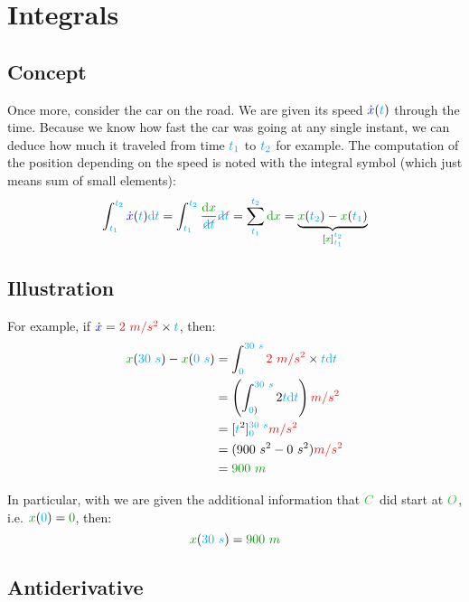 \section{Integrals}


\subsection{Concept}

Once more, consider the car on the road. We are given its speed
$\textcolor{blue}{\dot x}(\textcolor{cyan}{t})$ through the time. Because we know how fast the
car was going at any single instant, we can deduce how much it traveled
from time $\textcolor{cyan}{t_1}$ to $\textcolor{cyan}{t_2}$ for example. The computation
of the position depending on the speed is
noted with the integral symbol (which just means sum of small elements):
\[
\int_{\delay{t_1}}^{\delay{t_2}} \speed{\dot x}(\delay{t}) \delay{\dt}
= \int_{\delay{t_1}}^{\delay{t_2}} \frac {\dist{\d x}} {\strike[red]{\delay{\dt}}} \strike[red]{\delay{\dt}}
= \sum_{\delay{t_1}}^{\delay{t_2}} \dist{\d x}
= \underbrace{
	\dist{x}(\delay{t_2}) - \dist{x}(\delay{t_1})
}_{[\dist{x}]_{\delay{t_1}}^{\delay{t_2}}}
\]


\subsection{Illustration}

For example, if $\textcolor{blue}{\dot x} = \textcolor{red}{2~m/s^2} \times \textcolor{cyan}{t}$, then:
\begin{align*}
\dist{x}(\delay{30~s}) - \dist{x}(\delay{0~s})
&= \int_{\delay{0}}^{\delay{30~s}} \accel{2~m/s^2} \times \delay{t} \delay{\dt} \\
&= \left(\int_{\delay{0})}^{\delay{30~s}} 2 \delay{t} \delay{\dt}\right) \accel{m/s^2} \\
&= [\delay{t}^2]_{\delay{0}}^{\delay{30~s}} \accel{m/s^2} \\
&= (900~s^2 - 0~s^2) \accel{m/s^2} \\
&= \dist{900~m}
\end{align*}

In particular, with we are given the additional information that $\posit{C}$
did start at $\posit{O}$, i.e.  $\dist{x}(\delay{0}) = \dist{0}$, then:
\[
\dist{x}(\delay{30~s}) = \dist{900~m}
\]


\subsection{Antiderivative}

